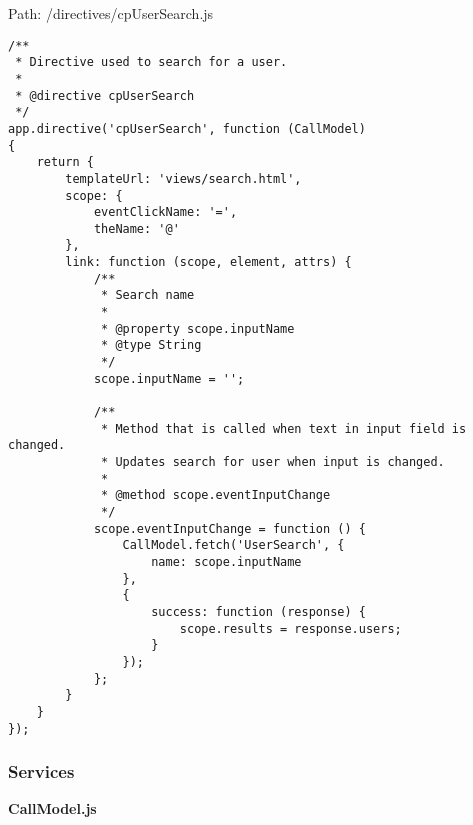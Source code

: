 Path: /directives/cpUserSearch.js
{\scriptsize
\begin{lstlisting}
/**
 * Directive used to search for a user.
 *
 * @directive cpUserSearch
 */
app.directive('cpUserSearch', function (CallModel)
{
	return {
		templateUrl: 'views/search.html',
		scope: {
			eventClickName: '=',
			theName: '@'
		},
		link: function (scope, element, attrs) {
			/**
			 * Search name
			 *
			 * @property scope.inputName
			 * @type String
			 */
			scope.inputName = '';

			/**
			 * Method that is called when text in input field is changed.
			 * Updates search for user when input is changed.
			 *
			 * @method scope.eventInputChange
			 */
			scope.eventInputChange = function () {
				CallModel.fetch('UserSearch', {
					name: scope.inputName
				},
				{
					success: function (response) {
						scope.results = response.users;
					}
				});
			};
		}
	}
});\end{lstlisting}
}
\subsubsection{Services}
\textbf{CallModel.js}

